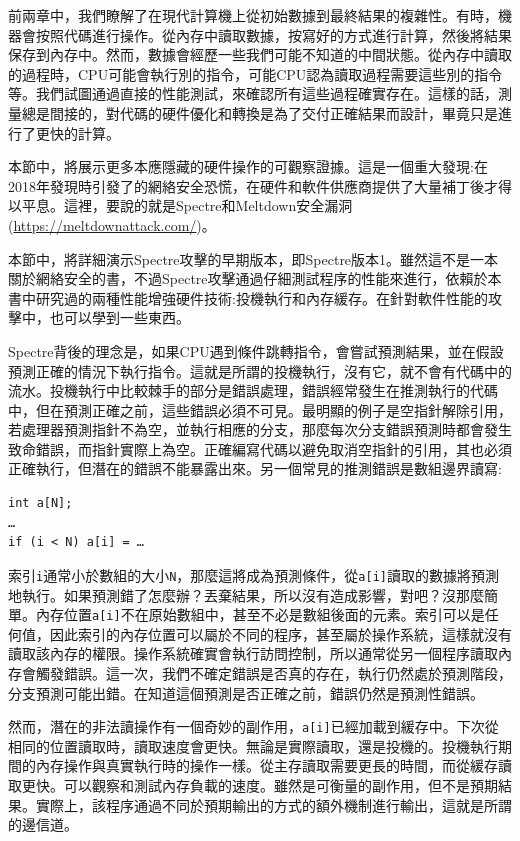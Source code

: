 
前兩章中，我們瞭解了在現代計算機上從初始數據到最終結果的複雜性。有時，機器會按照代碼進行操作。從內存中讀取數據，按寫好的方式進行計算，然後將結果保存到內存中。然而，數據會經歷一些我們可能不知道的中間狀態。從內存中讀取的過程時，CPU可能會執行別的指令，可能CPU認為讀取過程需要這些別的指令等。我們試圖通過直接的性能測試，來確認所有這些過程確實存在。這樣的話，測量總是間接的，對代碼的硬件優化和轉換是為了交付正確結果而設計，畢竟只是進行了更快的計算。

本節中，將展示更多本應隱藏的硬件操作的可觀察證據。這是一個重大發現:在2018年發現時引發了的網絡安全恐慌，在硬件和軟件供應商提供了大量補丁後才得以平息。這裡，要說的就是Spectre和Meltdown安全漏洞(\url{https://meltdownattack.com/})。


本節中，將詳細演示Spectre攻擊的早期版本，即Spectre版本1。雖然這不是一本關於網絡安全的書，不過Spectre攻擊通過仔細測試程序的性能來進行，依賴於本書中研究過的兩種性能增強硬件技術:投機執行和內存緩存。在針對軟件性能的攻擊中，也可以學到一些東西。

Spectre背後的理念是，如果CPU遇到條件跳轉指令，會嘗試預測結果，並在假設預測正確的情況下執行指令。這就是所謂的投機執行，沒有它，就不會有代碼中的流水。投機執行中比較棘手的部分是錯誤處理，錯誤經常發生在推測執行的代碼中，但在預測正確之前，這些錯誤必須不可見。最明顯的例子是空指針解除引用，若處理器預測指針不為空，並執行相應的分支，那麼每次分支錯誤預測時都會發生致命錯誤，而指針實際上為空。正確編寫代碼以避免取消空指針的引用，其也必須正確執行，但潛在的錯誤不能暴露出來。另一個常見的推測錯誤是數組邊界讀寫:

\begin{lstlisting}[style=styleCXX]
int a[N];
…
if (i < N) a[i] = …
\end{lstlisting}

索引\texttt{i}通常小於數組的大小\texttt{N}，那麼這將成為預測條件，從\texttt{a[i]}讀取的數據將預測地執行。如果預測錯了怎麼辦？丟棄結果，所以沒有造成影響，對吧？沒那麼簡單。內存位置\texttt{a[i]}不在原始數組中，甚至不必是數組後面的元素。索引可以是任何值，因此索引的內存位置可以屬於不同的程序，甚至屬於操作系統，這樣就沒有讀取該內存的權限。操作系統確實會執行訪問控制，所以通常從另一個程序讀取內存會觸發錯誤。這一次，我們不確定錯誤是否真的存在，執行仍然處於預測階段，分支預測可能出錯。在知道這個預測是否正確之前，錯誤仍然是預測性錯誤。

然而，潛在的非法讀操作有一個奇妙的副作用，\texttt{a[i]}已經加載到緩存中。下次從相同的位置讀取時，讀取速度會更快。無論是實際讀取，還是投機的。投機執行期間的內存操作與真實執行時的操作一樣。從主存讀取需要更長的時間，而從緩存讀取更快。可以觀察和測試內存負載的速度。雖然是可衡量的副作用，但不是預期結果。實際上，該程序通過不同於預期輸出的方式的額外機制進行輸出，這就是所謂的邊信道。

